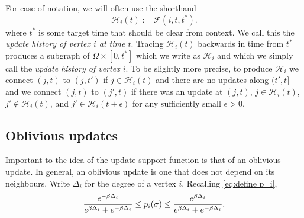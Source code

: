 	For ease of notation, we will often use the shorthand
	\begin{equation}
		\mathcal{H}_i(t) := \mathscr{F}(i, t, t^*).
	\end{equation}
	where $t^*$ is some target time that should be clear from context. We call this the \emph{update history of vertex $i$ at time $t$}. Tracing $\mathcal{H}_i(t)$ backwards in time from $t^*$ produces a subgraph of $\Omega \times [0, t^*]$ which we write as $\mathcal{H}_i$ and which we simply call the \emph{update history of vertex $i$}. To be slightly more precise, to produce $\mathcal{H}_i$ we connect $(j,t)$ to $(j,t')$ if $j \in \mathcal{H}_i(t)$ and there are no updates along $(t', t]$ and we connect $(j,t)$ to $(j',t)$ if there was an update at $(j, t)$, $j \in \mathcal{H}_i(t)$, $j' \notin \mathcal{H}_i(t)$, and $j' \in \mathcal{H}_i(t+\epsilon)$ for any sufficiently small $\epsilon > 0$.





	\subsection{Oblivious updates}

	Important to the idea of the update support function is that of an oblivious update. In general, an oblivious update is one that does not depend on its neighbours. Write $\Delta_i$ for the degree of a vertex $i$. Recalling \eqref{eq:define p_i},
	\begin{equation}
		\frac{e^{-\beta \Delta_i}}{e^{\beta \Delta_i} + e^{-\beta \Delta_i}} \leq p_i(\sigma) \leq \frac{e^{\beta \Delta_i}}{e^{\beta \Delta_i} + e^{-\beta \Delta_i}}.
	\end{equation}
	
